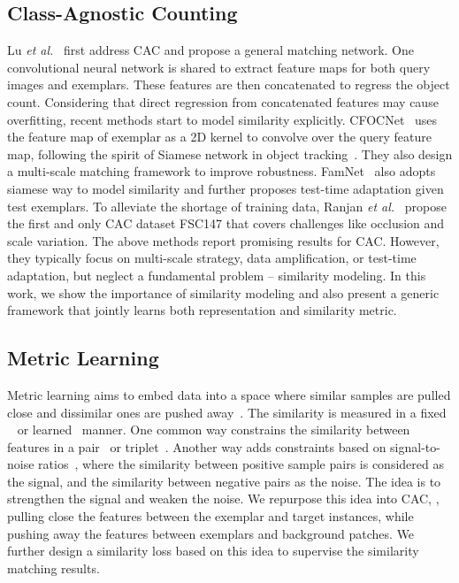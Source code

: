 \documentclass[10pt,twocolumn,letterpaper]{article}
\begin{document}
\subsection{Class-Agnostic Counting}
Lu \textit{et al.}~\cite{gmn} first address CAC and propose a general matching network. One convolutional neural network is shared to extract feature maps for both query images and exemplars. These features are then concatenated to regress the object count. Considering that direct regression from concatenated features may cause overfitting, recent methods start to model similarity explicitly. CFOCNet~\cite{cfocnet} uses the feature map of exemplar as a 2D kernel to convolve over the query feature map, following the spirit of Siamese network in object tracking~\cite{siamesenet}. They also design a multi-scale matching framework to improve robustness. FamNet~\cite{famnet} also adopts siamese way to model similarity and further proposes test-time adaptation given test exemplars. To alleviate the shortage of training data, Ranjan \textit{et al.}~\cite{famnet} propose the first and only CAC dataset FSC147 that covers challenges like occlusion and scale variation. The above methods report promising results for CAC. However, they typically focus on multi-scale strategy, data amplification, or test-time adaptation, but neglect a fundamental problem -- similarity modeling. In this work, we show the importance of similarity modeling and also present a generic framework that jointly learns both representation and similarity metric. 

\subsection{Metric Learning}
Metric learning aims to embed data into a space where similar samples are pulled close and dissimilar ones are pushed away~\cite{metric_learning_reality_check}. The similarity is measured in a fixed ~\cite{NCC1,LPNorm1} or learned~\cite{cosface, circle_loss} manner. One common way constrains the similarity between features in a pair~\cite{contrastive_loss} or triplet~\cite{ triplet_loss}. Another way adds constraints based on signal-to-noise ratios~\cite{snr_loss, info_nce, np_loss}, where the similarity between positive sample pairs is considered as the signal, and the similarity between negative pairs as the noise. The idea is to strengthen the signal and weaken the noise. We repurpose this idea into CAC, \ie, pulling close the features between the exemplar and target instances, while pushing away the features between exemplars and background patches. We further design a similarity loss based on this idea to supervise the similarity matching results. 
\end{document}

